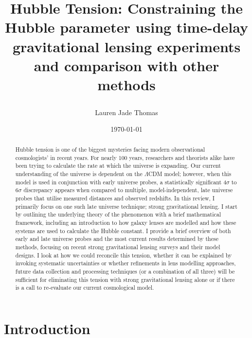 \documentclass[12pt]{report}
\title{\LARGE Hubble Tension: Constraining the Hubble parameter using time-delay gravitational lensing experiments and comparison with other methods %

}
\author{Lauren Jade Thomas}
\date{\today}
\begin{document}
\maketitle

\setlength{\parskip}{5pt}

\setlength{\parindent}{0pt} 

\renewcommand{\theequation}{\arabic{equation}}


\begin{abstract}
Hubble tension is one of the biggest mysteries facing modern observational cosmologists' in recent years. For nearly 100 years, researchers and theorists alike have been trying to calculate the rate at which the universe is expanding. Our current understanding of the universe is dependent on the $\Lambda$CDM model; however, when this model is used in conjunction with early universe probes, a statistically significant $4\sigma$ to $6\sigma$ discrepancy appears when compared to multiple, model-independent, late universe probes that utilise measured distances and observed redshifts. In this review, I primarily focus on one such late universe technique; strong gravitational lensing. I start by outlining the underlying theory of the phenomenon with a brief mathematical framework, including an introduction to how galaxy lenses are modelled and how these systems are used to calculate the Hubble constant. I provide a brief overview of both early and late universe probes and the most current results determined by these methods, focusing on recent strong gravitational lensing surveys and their model designs. I look at how we could reconcile this tension, whether it can be explained by invoking systematic uncertainties or whether refinements in lens modelling approaches, future data collection and processing techniques  (or a combination of all three) will be sufficient for eliminating this tension with strong gravitational lensing alone or if there is a call to re-evaluate our current cosmological model. 
\end{abstract}

\tableofcontents

\chapter{Introduction}
\end{document}
